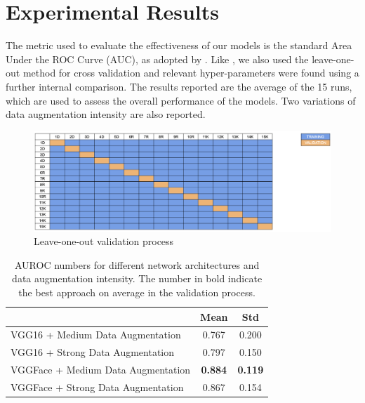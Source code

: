 \chapter{Experimental Results}

The metric used to evaluate the effectiveness of our models is the standard Area Under the ROC Curve (AUC), as adopted by \cite{abs-1807-01631}. Like \cite{CelonaM17}, we also used the leave-one-out method for cross validation and relevant hyper-parameters were found using a further internal comparison. The results reported are the average of the 15 runs, which are used to assess the overall performance of the models. Two variations of data augmentation intensity are also reported.

\begin{figure}[h!tp]
    \centering
    \includegraphics[width=1\textwidth]{imgs/chap4_validation.png}
    \caption{Leave-one-out validation process}
    \label{fig:validation}
\end{figure}

\begin{table}[htbp]
\centering
\caption{AUROC numbers for different network architectures and data augmentation intensity. The number in bold indicate the best approach on average in the validation process.}
\label{tab:results}
\begin{tabular}{lcc}
\hline
\multicolumn{1}{c}{}               & Mean           & Std            \\ \hline
VGG16 + Medium Data Augmentation   & 0.767          & 0.200          \\
VGG16 + Strong Data Augmentation   & 0.797          & 0.150          \\
VGGFace + Medium Data Augmentation & \textbf{0.884} & \textbf{0.119} \\
VGGFace + Strong Data Augmentation & 0.867          & 0.154          \\ \hline
\end{tabular}
\end{table}

